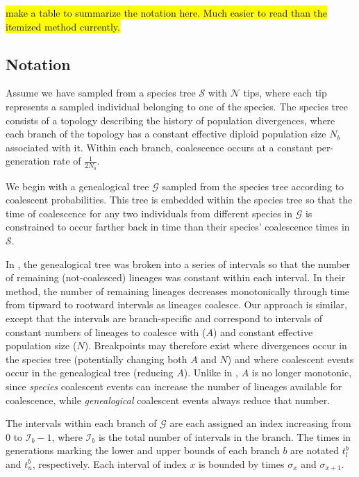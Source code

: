 \documentclass[11pt]{article}
\begin{document}
\hl{make a table to summarize the notation here. Much easier to read than the itemized method currently.}

\subsection{Notation}

Assume we have sampled from a species tree $\mathcal{S}$ with $\mathcal{N}$ tips, where each tip represents a sampled individual belonging to one of the species. The species tree consists of a topology describing the history of population divergences, where each branch of the topology has a constant effective diploid population size $N_b$ associated with it. Within each branch, coalescence occurs at a constant per-generation rate of $\frac{1}{2N_b}$. 

We begin with a genealogical tree $\mathcal{G}$ sampled from the species tree according to coalescent probabilities. This tree is embedded within the species tree so that the time of coalescence for any two individuals from different species in $\mathcal{G}$ is constrained to occur farther back in time than their species' coalescence times in $\mathcal{S}$.

In \citet{deng_distribution_2021}, the genealogical tree was broken into a series of intervals so that the number of remaining (not-coalesced) lineages was constant within each interval. In their method, the number of remaining lineages decreases monotonically through time from tipward to rootward intervals as lineages coalesce. Our approach is similar, except that the intervals are branch-specific and correspond to intervals of constant numbers of lineages to coalesce with ($A$) and constant effective population size ($N$). Breakpoints may therefore exist where divergences occur in the species tree (potentially changing both $A$ and $N$) and where coalescent events occur in the genealogical tree (reducing $A$). Unlike in \citet{deng_distribution_2021}, $A$ is no longer monotonic, since \emph{species} coalescent events can increase the number of lineages available for coalescence, while \emph{genealogical} coalescent events always reduce that number. 

The intervals within each branch of $\mathcal{G}$ are each assigned an index increasing from $0$ to $\mathcal{I}_b-1$, where $\mathcal{I}_b$ is the total number of intervals in the branch. The times in generations marking the lower and upper bounds of each branch $b$ are notated $t_l^b$ and $t_u^b$, respectively. Each interval of index $x$ is bounded by times $\sigma_x$ and $\sigma_{x+1}$.
\end{document}
